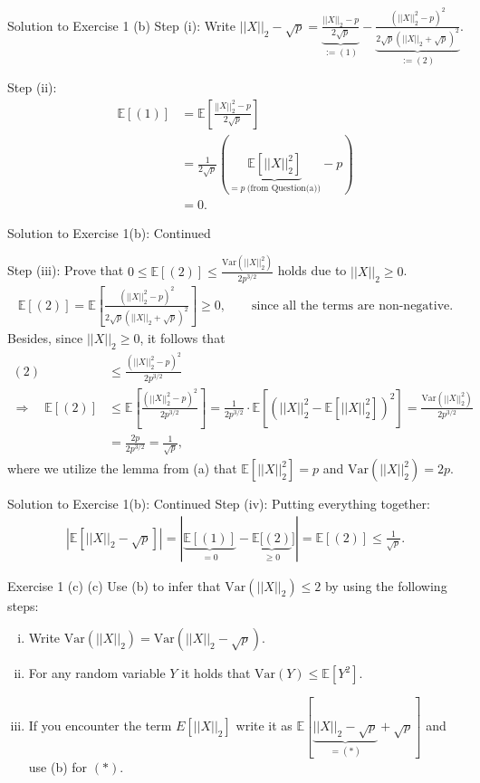\documentclass[aspectratio=169]{beamer}
\renewcommand{\E}{\mathbb{E}}
\newcommand{\Xnorm}{||X||_2}
\newcommand{\Xnormsq}{||X||_2^2}
\newcommand{\Var}[1]{\mathrm{Var}(#1)}
\begin{document}
\begin{frame}{Solution to Exercise 1 (b)}
	\small
	Step (i): Write $\Xnorm - \sqrt{p} = \underbrace{\frac{\Xnorm - p}{2\sqrt{p}}}_{:= (1)} - \underbrace{\frac{(\Xnormsq - p)^2}{2\sqrt{p}(||X||_2 + \sqrt{p})^2}}_{:= (2)}.$ 
	
	Step (ii): 
		\begin{align*}
			\E[(1)] &= \E \left[\frac{\Xnormsq - p}{2\sqrt{p}} \right] \\
			&= \frac{1}{2\sqrt{p}} (\underbrace{\E[\Xnormsq]}_{= p \ \text{(from Question(a))}} - p) \\
			&= 0.
		\end{align*}
\end{frame}

\begin{frame}{Solution to Exercise 1(b): Continued}

	Step (iii):	Prove that $0 \leq \E[(2)] \leq \frac{\Var{\Xnormsq}}{2 p^{3/2}}$ holds due to $||X||_2 \geq 0$.
	\begin{align*}
		\E[(2)] = \E \left[ \frac{(\Xnormsq - p)^2}{2\sqrt{p}(||X||_2 + \sqrt{p})^2}\right] \geq 0, \qquad \text{since all the terms are non-negative.}
	\end{align*}
	Besides, since $\Xnorm \geq 0$, it follows that 
	\begin{align*}
		(2) &\leq \frac{(\Xnormsq - p)^2}{2 p^{3/2}} \\
		\Rightarrow \quad \E[(2)] &\leq  \E \left[ \frac{(\Xnormsq - p)^2}{2 p^{3/2}} \right] = \frac{1}{2p^{3/2}} \cdot \E \left[(\Xnormsq - \E[\Xnormsq])^2 \right] = \frac{\Var{\Xnormsq}}{2p^{3/2}} \\
		&= \frac{2p}{2p^{3/2}} = \frac{1}{\sqrt{p}},
	\end{align*}
	where we utilize the lemma from (a) that $\E[\Xnormsq] = p$ and $\Var{\Xnormsq} = 2p$.
\end{frame}

\begin{frame}{Solution to Exercise 1(b): Continued}
	Step (iv): Putting everything together:
	\begin{align*}
		|\E[\Xnorm - \sqrt{p}]| = |\underbrace{\E[(1)]}_{=0} - \underbrace{\E[(2)}_{\geq 0}]| = \E[(2)] \leq \frac{1}{\sqrt{p}}.
	\end{align*}
\end{frame}

\begin{frame}{Exercise 1 (c)}
	(c) Use (b) to infer that $\Var{\Xnorm} \leq 2$ by using the following steps:
	\begin{enumerate}[(i)]
		\item Write $\Var{\Xnorm} = \Var{\Xnorm - \sqrt{p}}$.
		\item For any random variable $Y$ it holds that $\Var{Y} \leq \E[Y^2] $.
		\item If you encounter the term $E[\Xnorm]$ write it as $\E[\underbrace{\Xnorm - \sqrt{p}}_{= (*)} + \sqrt{p}]$ and use (b) for $(*)$.
	\end{enumerate}
\end{frame}
\end{document}
